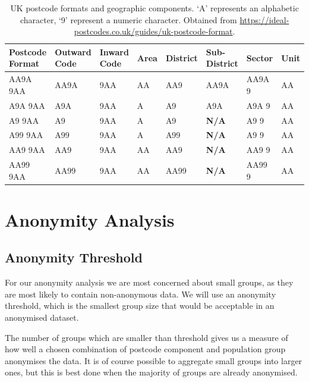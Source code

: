 \documentclass[12pt, a4paper]{article}
\begin{document}
\begin{table}
\begin{center}
	\begin{tabular}{ m{}  m{}  m{}  m{}  m{}  m{}  m{}  m{}}
		\toprule
        Postcode Format & Outward Code & Inward Code & Area & District & Sub-District & Sector & Unit \\
        \midrule
		AA9A 9AA & AA9A & 9AA & AA & AA9 & AA9A & AA9A 9 & AA \\
        A9A 9AA & A9A & 9AA & A & A9 & A9A & A9A 9 & AA \\
        A9 9AA & A9 & 9AA & A & A9 & \textbf{\textbf{N/A}} & A9 9 & AA \\
        A99 9AA & A99 & 9AA & A & A99 & \textbf{N/A} & A9 9 & AA \\
        AA9 9AA & AA9 & 9AA & AA & AA9 & \textbf{N/A} & AA9 9 & AA \\
        AA99 9AA & AA99 & 9AA  & AA & AA99 & \textbf{N/A} & AA99 9 & AA\\
        \bottomrule
    \end{tabular}
\caption{UK postcode formats and geographic components. `A' represents an alphabetic character, `9' represent a numeric character. Obtained from \url{https://ideal-postcodes.co.uk/guides/uk-postcode-format}.}\label{table:postcode_format}
\end{center}
\end{table}

\section{Anonymity Analysis}
\subsection{Anonymity Threshold}

For our anonymity analysis we are most concerned about small groups, as they are most likely to contain non-anonymous data. We will use an anonymity threshold, which is the smallest group size that would be acceptable in an anonymised dataset.

 The number of groups which are smaller than threshold gives us a measure of how well a chosen combination of postcode component and population group anonymises the data. It is of course possible to aggregate small groups into larger ones, but this is best done when the majority of groups are already anonymised.
\end{document}
